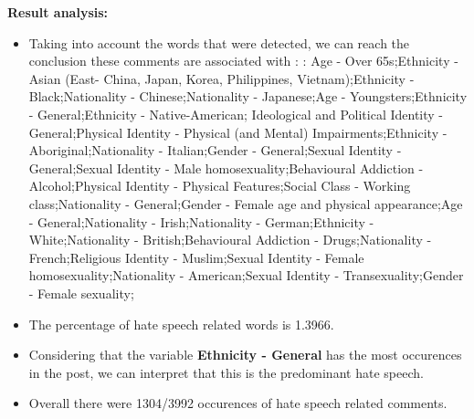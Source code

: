 \documentclass[11pt]{article}
\begin{document}
\textbf{\Large Result analysis:}

\begin{itemize}\item Taking into account the words that were detected, we can reach the conclusion these comments are associated with : : Age - Over 65s;Ethnicity - Asian (East- China, Japan, Korea, Philippines, Vietnam);Ethnicity - Black;Nationality - Chinese;Nationality - Japanese;Age - Youngsters;Ethnicity - General;Ethnicity - Native-American; Ideological and Political Identity - General;Physical Identity - Physical (and Mental) Impairments;Ethnicity - Aboriginal;Nationality - Italian;Gender - General;Sexual Identity - General;Sexual Identity - Male homosexuality;Behavioural Addiction - Alcohol;Physical Identity - Physical Features;Social Class - Working class;Nationality - General;Gender - Female age and physical appearance;Age - General;Nationality - Irish;Nationality - German;Ethnicity - White;Nationality - British;Behavioural Addiction - Drugs;Nationality - French;Religious Identity - Muslim;Sexual Identity - Female homosexuality;Nationality - American;Sexual Identity - Transexuality;Gender - Female sexuality;%

\item The percentage of hate speech related words is 1.3966.

\item Considering that the variable \textbf{Ethnicity - General} has the most occurences in the post, we can interpret that this is the predominant hate speech.

\item Overall there were 1304/3992 occurences of hate speech related comments.\end{itemize}
\end{document}
